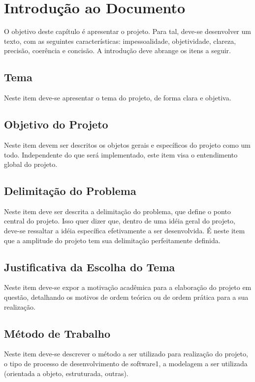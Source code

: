 \chapter{Introdução ao Documento}


O objetivo deste capítulo é apresentar o projeto. Para tal, deve-se desenvolver um texto, com as seguintes características: impessoalidade, objetividade, clareza, precisão, coerência e concisão. A introdução deve abrange os itens a seguir.

\section{Tema}

Neste item deve-se apresentar o tema do projeto, de forma clara e objetiva.


\section{Objetivo do Projeto}

Neste item devem ser descritos os objetos gerais e específicos do projeto como um todo. Independente do que será implementado, este item visa o entendimento global do projeto.

\section{Delimitação do Problema}


Neste item deve ser descrita a delimitação do problema, que define o ponto central do projeto. Isso quer dizer que, dentro de uma idéia geral do projeto, deve-se ressaltar a idéia específica efetivamente a ser desenvolvida. É neste item que a amplitude do projeto tem sua delimitação perfeitamente definida.

\section{Justificativa da Escolha do Tema}

Neste item deve-se expor a motivação acadêmica para a elaboração do projeto em questão, detalhando os motivos de ordem teórica ou de ordem prática para a sua realização.


\section{Método de Trabalho}

Neste item deve-se descrever o método a ser utilizado para realização do projeto, o tipo de processo de desenvolvimento de software1, a modelagem a ser utilizada (orientada a objeto, estruturada, outras).



